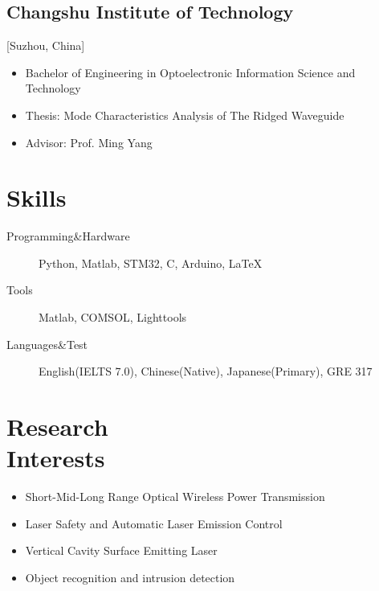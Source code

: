 \documentclass{mycv}
\begin{document}
\subsection{Changshu Institute of Technology}[Suzhou, China]
\vspace{-\parskip}%
\begin{itemize}[label={}]
  \item Bachelor of Engineering in Optoelectronic Information Science and Technology  \\ 
  \item Thesis: {Mode Characteristics Analysis of The Ridged Waveguide}
  \item Advisor: Prof. Ming Yang
\end{itemize}

\section{Skills}

\begin{description}
  \item[Programming\&Hardware] Python, Matlab, STM32, C, Arduino, \LaTeX
  \item[Tools] Matlab, COMSOL, Lighttools
  \item[Languages\&Test] English(IELTS 7.0), Chinese(Native), Japanese(Primary), GRE 317
\end{description}

\section{Research \\ Interests}

\begin{itemize}
  \item Short-Mid-Long Range Optical Wireless Power Transmission
  \item Laser Safety and Automatic Laser Emission Control
  \item Vertical Cavity Surface Emitting Laser
  \item Object recognition and intrusion detection
\end{itemize}
\end{document}
